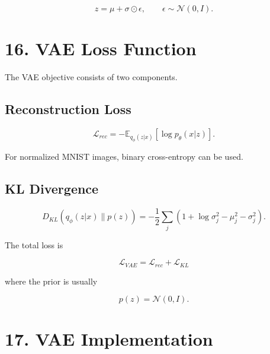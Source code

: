 \documentclass[10pt]{article}
\begin{document}
\[
z=\mu+\sigma\odot\epsilon,
\qquad
\epsilon\sim\mathcal{N}(0,I).
\]

\begin{center}
\end{center}

\section*{16. VAE Loss Function}

The VAE objective consists of two components.

\subsection*{Reconstruction Loss}

\[
\mathcal{L}_{rec}
=
-\mathbb{E}_{q_{\phi}(z|x)}
[\log p_{\theta}(x|z)].
\]

For normalized MNIST images, binary cross-entropy can be used.

\subsection*{KL Divergence}

\[
D_{KL}
\left(
q_{\phi}(z|x)\parallel p(z)
\right)
=
-\frac{1}{2}
\sum_j
\left(
1+\log\sigma_j^2-\mu_j^2-\sigma_j^2
\right).
\]

The total loss is

\[
\boxed{
\mathcal{L}_{VAE}
=
\mathcal{L}_{rec}
+
\mathcal{L}_{KL}
}
\]

where the prior is usually

\[
p(z)=\mathcal{N}(0,I).
\]

\section*{17. VAE Implementation}
\end{document}
